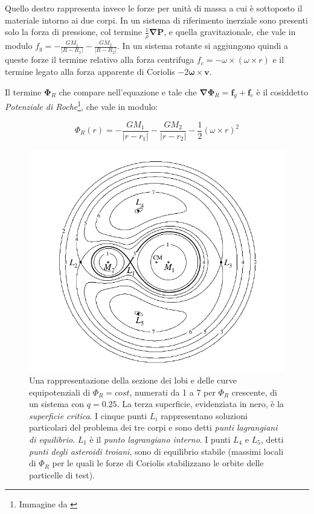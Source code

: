 \documentclass[a4paperbi]{article}
\begin{document}
	Quello destro rappresenta invece le forze per unità di massa a cui è sottoposto il materiale intorno ai due corpi. In un sistema di riferimento inerziale sono presenti solo la forza di pressione, col termine $\frac{1}{\rho}\bm{\nabla}\bm{P}$, e quella gravitazionale, che vale in modulo $f_g=-\frac{GM_1}{|R-R_1|}-\frac{GM_2}{|R-R_2|}$. In un sistema rotante si aggiungono quindi a queste forze il termine relativo alla forza centrifuga $f_c=-\omega\times(\omega\times r)$ e il termine legato alla forza apparente di Coriolis $-2\bm{\omega}\times\bm{v}$.
	
	Il termine $\bm{\Phi}_R$ che compare nell'equazione e tale che $\bm{\nabla}\bm{\Phi}_R=\bm{f}_g+\bm{f}_c$ è il cosiddetto \textit{Potenziale di Roche}\footnote{Immagine da \cite{FrankKingRaineAccretionPower}}, che vale in modulo:

	\begin{equation}
		\Phi_R(\textit{r})=-\frac{GM_1}{\vert\textit{r}-\textit{r}_1\vert}-\frac{GM_2}{\vert\textit{r}-\textit{r}_2\vert}-\frac{1}{2}(\omega\times\textit{r})^2
	\end{equation}
	
	\begin{figure}[H]
		\centering
		\includegraphics[width=0.6\linewidth]{RocheEquipotential}
		\caption{Una rappresentazione della sezione dei lobi e delle curve equipotenziali di $\Phi_R=cost$, numerati da 1 a 7 per $\Phi_R$ crescente, di un sistema con $q=0.25$. La terza superficie, evidenziata in nero, è la \textit{superficie critica}. I cinque punti $L_i$ rappresentano soluzioni particolari del problema dei tre corpi e sono detti \textit{punti lagrangiani di equilibrio}. $L_1$ è il \textit{punto lagrangiano interno}. I punti $L_4$ e $L_5$, detti \textit{punti degli asteroidi troiani}, sono di equilibrio stabile (massimi locali di $\Phi_R$ per le quali le forze di Coriolis stabilizzano le orbite delle particelle di test).}
		\label{fig:rocheequipotential}
	\end{figure}
\end{document}
